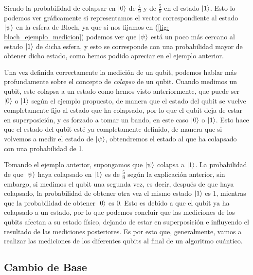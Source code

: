 \documentclass[12pt]{article}
\numberwithin{equation}{section} %
\begin{document}
    Siendo la probabilidad de colapsar en \( \ket{0} \) de \( \frac{4}{9} \) y de \( \frac{5}{9} \) en el estado \( \ket{1} \). Esto lo podemos ver gráficamente si representamos el vector correspondiente al estado \( \ket{\psi} \) en la esfera de Bloch, ya que si nos fijamos en (\ref{fig: bloch_ejemplo_medicion}) podemos ver que \( \ket{\psi} \) está un poco más cercano al estado \( \ket{1} \) de dicha esfera, y esto se corresponde con una probabilidad mayor de obtener dicho estado, como hemos podido apreciar en el ejemplo anterior.

    \vspace{5mm}

    Una vez definida correctamente la medición de un qubit, podemos hablar más profundamente sobre el concepto de \textit{colapso} de un qubit. Cuando medimos un qubit, este colapsa a un estado como hemos visto anteriormente, que puede ser \( \ket{0} \) o \( \ket{1} \) según el ejemplo propuesto, de manera que el estado del qubit se vuelve completamente fijo al estado que ha colapsado, por lo que el qubit deja de estar en superposición, y es forzado a tomar un bando, en este caso \( \ket{0} \) o \( \ket{1} \). Esto hace que el estado del qubit esté ya completamente definido, de manera que si volvemos a medir el estado de \( \ket{\psi} \), obtendremos el estado al que ha colapsado con una probabilidad de 1.

    \vspace{5mm}

    Tomando el ejemplo anterior, supongamos que \( \ket{\psi} \) colapsa a \( \ket{1} \). La probabilidad de que \( \ket{\psi} \) haya colapsado en \( \ket{1} \) es de \( \frac{5}{9} \) según la explicación anterior, sin embargo, si medimos el qubit una segunda vez, es decir, después de que haya colapsado, la probabilidad de obtener otra vez el mismo estado \( \ket{1} \) es 1, mientras que la probabilidad de obtener \( \ket{0} \) es 0. Esto es debido a que el qubit ya ha colapsado a un estado, por lo que podemos concluir que las mediciones de los qubits afectan a su estado físico, dejando de estar en superposición e influyendo el resultado de las mediciones posteriores. Es por esto que, generalmente, vamos a realizar las mediciones de los diferentes qubits al final de un algoritmo cuántico.

    \vspace{10mm}





    \subsection{Cambio de Base}
\end{document}
